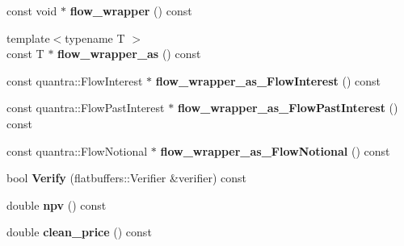 \begin{DoxyCompactItemize}
\mbox{\label{structquantra_1_1FLATBUFFERS__FINAL__CLASS_a1dca41a62b72f409dbfd6d27ab43aad1}} 
const void $\ast$ {\bfseries flow\+\_\+wrapper} () const
\item 
\mbox{\label{structquantra_1_1FLATBUFFERS__FINAL__CLASS_a2225cfd4922352beac5604d8a00f46ef}} 
{\footnotesize template$<$typename T $>$ }\\const T $\ast$ {\bfseries flow\+\_\+wrapper\+\_\+as} () const
\item 
\mbox{\label{structquantra_1_1FLATBUFFERS__FINAL__CLASS_a90a09a81669c2966fc96de3c3e32757b}} 
const quantra\+::\+Flow\+Interest $\ast$ {\bfseries flow\+\_\+wrapper\+\_\+as\+\_\+\+Flow\+Interest} () const
\item 
\mbox{\label{structquantra_1_1FLATBUFFERS__FINAL__CLASS_a5abc9ea9cd01f6d33a1b75cd92e0cb09}} 
const quantra\+::\+Flow\+Past\+Interest $\ast$ {\bfseries flow\+\_\+wrapper\+\_\+as\+\_\+\+Flow\+Past\+Interest} () const
\item 
\mbox{\label{structquantra_1_1FLATBUFFERS__FINAL__CLASS_a2a1544e4ddf5c0ba47c8bc004f4963c3}} 
const quantra\+::\+Flow\+Notional $\ast$ {\bfseries flow\+\_\+wrapper\+\_\+as\+\_\+\+Flow\+Notional} () const
\item 
\mbox{\label{structquantra_1_1FLATBUFFERS__FINAL__CLASS_aed693ee5a45b5f53af7411f9cab6793a}} 
bool {\bfseries Verify} (flatbuffers\+::\+Verifier \&verifier) const
\item 
\mbox{\label{structquantra_1_1FLATBUFFERS__FINAL__CLASS_a3c5c36412aa6b8018c6e9293f8f7dbe9}} 
double {\bfseries npv} () const
\item 
\mbox{\label{structquantra_1_1FLATBUFFERS__FINAL__CLASS_aedf3e4f110d0379f9d6ceffa31ba49e7}} 
double {\bfseries clean\+\_\+price} () const
\item 
\mbox{\label{structquantra_1_1FLATBUFFERS__FINAL__CLASS_a51261931153c996abe54368473b7fab2}} 

\end{DoxyCompactItemize}
